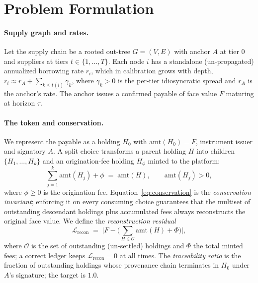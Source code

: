 \documentclass[10pt,twocolumn,letterpaper]{article}
\begin{document}
\section{Problem Formulation}

\paragraph{Supply graph and rates.} Let the supply chain be a rooted out-tree
$G=(V,E)$ with anchor $A$ at tier $0$ and suppliers at tiers $t\in\{1,\dots,T\}$. Each
node $i$ has a standalone (un-propagated) annualized borrowing rate $r_i$, which in
calibration grows with depth, $r_i \approx r_A + \sum_{k\le t(i)} \gamma_k$, where
$\gamma_k>0$ is the per-tier idiosyncratic spread and $r_A$ is the anchor's rate. The
anchor issues a confirmed payable of face value $F$ maturing at horizon $\tau$.

\paragraph{The token and conservation.} We represent the payable as a holding
$H_0$ with $\mathrm{amt}(H_0)=F$, instrument issuer and signatory $A$. A
split choice transforms a parent holding $H$ into children
$\{H_1,\dots,H_k\}$ and an origination-fee holding $H_\phi$ minted to the platform:
\begin{equation}
\textstyle\sum_{j=1}^{k}\mathrm{amt}(H_j) + \phi \;=\; \mathrm{amt}(H),
\qquad \mathrm{amt}(H_j) > 0,
\label{eq:conservation}
\end{equation}
where $\phi\ge 0$ is the origination fee. Equation~\eqref{eq:conservation} is the
\emph{conservation invariant}; enforcing it on every consuming choice guarantees that
the multiset of outstanding descendant holdings plus accumulated fees always
reconstructs the original face value. We define the \emph{reconstruction residual}
\begin{equation}
\mathcal{L}_{\mathrm{recon}} \;=\;
\Big| F - \big(\textstyle\sum_{H\in \mathcal{O}}\mathrm{amt}(H) + \Phi\big)\Big|,
\label{eq:recon}
\end{equation}
where $\mathcal{O}$ is the set of outstanding (un-settled) holdings and $\Phi$ the
total minted fees; a correct ledger keeps $\mathcal{L}_{\mathrm{recon}}=0$ at all
times. The \emph{traceability ratio} is the fraction of outstanding holdings whose
provenance chain terminates in $H_0$ under $A$'s signature; the target is $1.0$.
\end{document}
